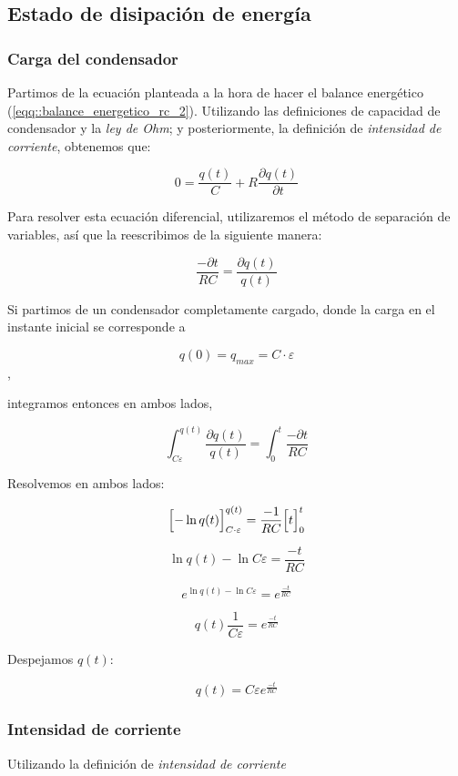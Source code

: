 \documentclass[../main.tex]{subfiles}
\begin{document}
\subsection{Estado de disipación de energía}

\subsubsection{Carga del condensador}

\label{part::descarga_condensador_1}
Partimos de la ecuación planteada a la hora de hacer el balance energético (\ref{eqq::balance_energetico_rc_2}). Utilizando las definiciones de capacidad de condensador y la \textit{ley de Ohm}; y posteriormente, la definición de \textit{intensidad de corriente}, obtenemos que:

$$0 = \frac{q(t)}{C} + R\frac{\partial q(t)}{\partial t}$$

Para resolver esta ecuación diferencial, utilizaremos el método de separación de variables, así que la reescribimos de la siguiente manera:

$$\frac{-\partial t}{RC} = \frac{\partial q(t)}{q(t)}$$

Si partimos de un condensador completamente cargado, donde la carga en el instante inicial se corresponde a 

$$q(0) = q_{max} = C \cdot \varepsilon$$,

integramos entonces en ambos lados,

$$\int_{C\varepsilon}^{q(t)} \frac{\partial q(t)}{q(t)}  = \int_{0}^{t} \frac{-\partial t}{RC} $$

Resolvemos en ambos lados:

$$\Bigl[ -\ln{q(t)} \Bigr]_{C\cdot \varepsilon}^{q(t)} = \frac{-1}{RC}\Bigl[  t\Bigr]_0^{t}$$

$$\ln{q(t)} - \ln{C\varepsilon} = \frac{-t}{RC}$$

{\large
$$ e^{\ln{q(t)} - \ln{C\varepsilon}} = e^{\frac{-t}{RC}}$$ }

$$q(t)\frac{1}{C\varepsilon} = e^{\frac{-t}{RC}} $$

Despejamos $q(t)$:

\begin{equation}
    q(t) = C \varepsilon e^{\frac{-t}{RC}}
    \label{eqq::q(t)_descarga_rc}
\end{equation}


\subsubsection{Intensidad de corriente}
\label{part::descarga_condensador_2}
Utilizando la definición de \textit{intensidad de corriente}
\end{document}
